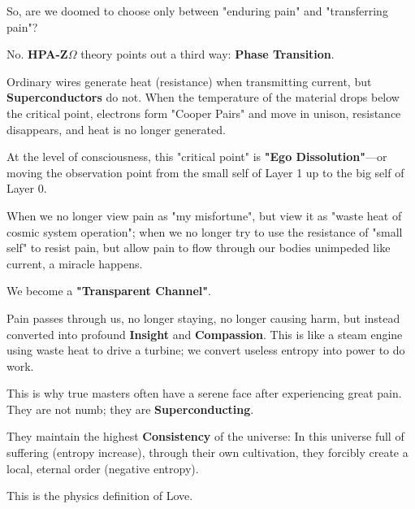 So, are we doomed to choose only between "enduring pain" and "transferring pain"?

No. \textbf{HPA-Z$\Omega$} theory points out a third way: \textbf{Phase Transition}.

Ordinary wires generate heat (resistance) when transmitting current, but \textbf{Superconductors} do not. When the temperature of the material drops below the critical point, electrons form "Cooper Pairs" and move in unison, resistance disappears, and heat is no longer generated.

At the level of consciousness, this "critical point" is \textbf{"Ego Dissolution"}—or moving the observation point from the small self of Layer 1 up to the big self of Layer 0.

When we no longer view pain as "my misfortune", but view it as "waste heat of cosmic system operation"; when we no longer try to use the resistance of "small self" to resist pain, but allow pain to flow through our bodies unimpeded like current, a miracle happens.

We become a \textbf{"Transparent Channel"}.

Pain passes through us, no longer staying, no longer causing harm, but instead converted into profound \textbf{Insight} and \textbf{Compassion}. This is like a steam engine using waste heat to drive a turbine; we convert useless entropy into power to do work.

This is why true masters often have a serene face after experiencing great pain. They are not numb; they are \textbf{Superconducting}.

They maintain the highest \textbf{Consistency} of the universe: In this universe full of suffering (entropy increase), through their own cultivation, they forcibly create a local, eternal order (negative entropy).

This is the physics definition of Love.

